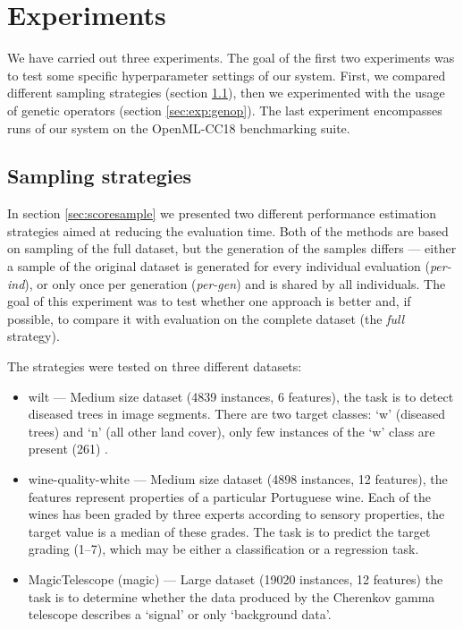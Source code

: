 \chapter{Experiments} \label{experiments}
We have carried out three experiments. The goal of the first two experiments was
to test some specific hyperparameter settings of our system. First, we compared
different sampling strategies (section \ref{sec:exp:sample}), then we
experimented with the usage of genetic operators (section \ref{sec:exp:genop}).
The last experiment encompasses runs of our system on the OpenML-CC18 benchmarking
suite.

\section{Sampling strategies} \label{sec:exp:sample}
In section \ref{sec:scoresample} we presented two different performance
estimation strategies aimed at reducing the evaluation time. Both of the methods
are based on sampling of the full dataset, but the generation of the samples
differs --- either a sample of the original dataset is generated for every
individual evaluation (\emph{per-ind}), or only once per generation
(\emph{per-gen}) and is shared by all individuals. The goal of this experiment
was to test whether one approach is better and, if possible, to compare it with
evaluation on the complete dataset (the \emph{full} strategy).

The strategies were tested on three different datasets:

\begin{itemize}
\item wilt --- Medium size dataset (4839 instances, 6 features), the task is to
detect diseased trees in image segments. There are two target classes: `w' (diseased
trees) and `n' (all other land cover), only few instances of the `w' class
are present (261) \citep{doi:10.1080/01431161.2013.810825}.
\item wine-quality-white --- Medium size dataset (4898 instances, 12 features),
the features represent properties of a particular Portuguese wine. Each of the
wines has been graded by three experts according to sensory properties, the
target value is a median of these grades. The task is to predict the target
grading (1--7), which may be either a classification or a regression task.
\citep{CORTEZ2009547}
\item MagicTelescope (magic) --- Large dataset (19020 instances, 12 features)
the task is to determine whether the data produced by the Cherenkov gamma
telescope describes a `signal' or only `background data'. \citep{BOCK2004511}
\end{itemize}


